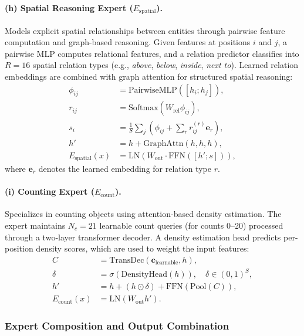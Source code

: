 \paragraph{(h) Spatial Reasoning Expert ($E_{\text{spatial}}$).}
Models explicit spatial relationships between entities through pairwise feature computation and graph-based reasoning. Given features at positions $i$ and $j$, a pairwise MLP computes relational features, and a relation predictor classifies into $R = 16$ spatial relation types (e.g., \textit{above}, \textit{below}, \textit{inside}, \textit{next to}). Learned relation embeddings are combined with graph attention for structured spatial reasoning:
\begin{align}
    \phi_{ij} &= \text{PairwiseMLP}\!\left([h_i; h_j]\right), \\
    r_{ij} &= \text{Softmax}\!\left(W_{\text{rel}} \phi_{ij}\right), \\
    s_i &= \frac{1}{S} \sum_j \left(\phi_{ij} + \sum_r r_{ij}^{(r)} \mathbf{e}_r \right), \\
    h' &= h + \text{GraphAttn}(h, h, h), \\
    E_{\text{spatial}}(x) &= \text{LN}\!\left(W_{\text{out}} \cdot \text{FFN}([h'; s])\right),
\end{align}
where $\mathbf{e}_r$ denotes the learned embedding for relation type $r$.

\paragraph{(i) Counting Expert ($E_{\text{count}}$).}
Specializes in counting objects using attention-based density estimation. The expert maintains $N_c = 21$ learnable count queries (for counts 0--20) processed through a two-layer transformer decoder. A density estimation head predicts per-position density scores, which are used to weight the input features:
\begin{align}
    C &= \text{TransDec}(\mathbf{c}_{\text{learnable}}, h), \\
    \delta &= \sigma\!\left(\text{DensityHead}(h)\right), \quad \delta \in (0,1)^S, \\
    h' &= h + (h \odot \delta) + \text{FFN}\!\left(\text{Pool}(C)\right), \\
    E_{\text{count}}(x) &= \text{LN}\!\left(W_{\text{out}} h'\right).
\end{align}

\subsubsection{Expert Composition and Output Combination}
\label{sec:method:fusion:composition}

